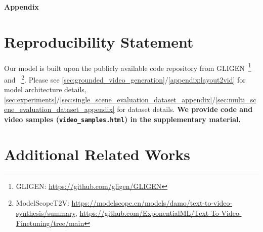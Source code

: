 
{
\begin{center}
    \textbf{{{\Large Appendix}}}
\end{center}
}

\renewcommand\thesection{\Alph{section}}
\renewcommand\thesubsection{\Alph{section}.\arabic{subsection}}


\appendix
\startcontents[sections]



\vspace{20pt}


\section{Reproducibility Statement}\label{appendix:code}


Our model is built upon the publicly available code repository from GLIGEN~\citep{li2023gligen}\footnote{GLIGEN: \url{https://github.com/gligen/GLIGEN}} and \modelscope{}~\citep{wang2023modelscope}\footnote{ModelScopeT2V: \url{https://modelscope.cn/models/damo/text-to-video-synthesis/summary}, \url{https://github.com/ExponentialML/Text-To-Video-Finetuning/tree/main}}. 
Please see \cref{sec:grounded_video_generation}/\cref{appendix:layout2vid} for model architecture details, \cref{sec:experiments}/\cref{sec:single_scene_evaluation_dataset_appendix}/\cref{sec:multi_scene_evaluation_dataset_appendix} for dataset details.
\textbf{We provide code and video samples (\texttt{video\_samples.html}) in the supplementary material.}




\section{Additional Related Works}\label{appendix:related_works}
